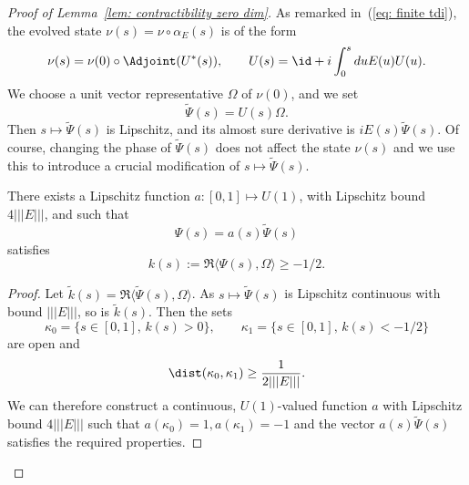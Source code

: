 \begin{proof}[Proof of Lemma~\ref{lem: contractibility zero dim}]
	As remarked in~(\ref{eq: finite tdi}), the evolved state $\nu(s)=\nu\circ \alpha_E(s)$ is of the form
	$$
	\nu(s) = \nu(0)\circ \Adjoint( U^*(s)), \qquad  U(s)=\id+i\int_0^s du E(u)U(u).
	$$
	We choose a unit vector representative $\Omega$ of $\nu(0)$, and we set 
	$$
	\widetilde\Psi(s)= U(s) \Omega.
	$$
	Then $s\mapsto\widetilde\Psi(s)$ is Lipschitz, and its almost sure derivative is $i E(s)\widetilde\Psi(s)$. 
	Of course, changing the phase of $\widetilde\Psi(s)$ does not affect the state $\nu(s)$ and we use this to introduce a crucial modification of $s\mapsto \widetilde\Psi(s)$.
	\begin{lemma}
		There exists a Lipschitz function $a: [0,1]\mapsto U(1)$, with Lipschitz bound $ 4|||E||| $, and such that 
		$$
		\Psi(s)= a(s) \widetilde\Psi(s)
		$$ 
		satisfies
		$$
		k(s) := \Re \langle \Psi(s) , \Omega \rangle \geq -1/2.
		$$
	\end{lemma}
	\begin{proof}
		Let $\widetilde k(s)=\Re \langle \widetilde \Psi(s) , \Omega \rangle$. As $s\mapsto \widetilde \Psi(s)$ is Lipschitz continuous with bound $|||E|||$, so is $\widetilde k(s)$. Then the sets
		$$
		\kappa_0=\{ s\in [0,1], \, k(s)> 0   \}, \qquad 
		\kappa_1=\{ s\in [0,1], \,  k(s)< -1/2   \}
		$$
		are open and
		$$
		\dist(\kappa_0,\kappa_1) \geq \frac{1}{2 |||E|||}.
		$$
		We can therefore construct a continuous, $U(1)$-valued function $a$ with Lipschitz bound $4 |||E|||$  such that $a(\kappa_0)=1, a(\kappa_1) =-1$
		and the vector $a(s)\widetilde\Psi(s)$ satisfies the required properties.
	\end{proof}
	

\end{proof}
